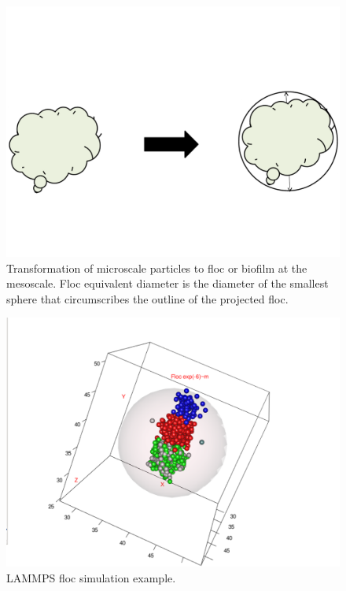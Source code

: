 \documentclass[12pt,titlepage]{report}
\theoremstyle{definition}
\theoremstyle{remark}
\begin{document}

\begin{figure}[!ht] 
\includegraphics[width=1.1\textwidth]{diagram2}
\caption[]{Transformation of microscale particles to floc or biofilm at the mesoscale. Floc equivalent diameter is the diameter of the smallest sphere that circumscribes the outline of the projected floc.}\label{diag2}
\end{figure}

\begin{figure}[!ht] 
\includegraphics[width=1.1\textwidth]{p2}
\caption[]{LAMMPS floc simulation example.}\label{f1}
\end{figure}
\end{document}
